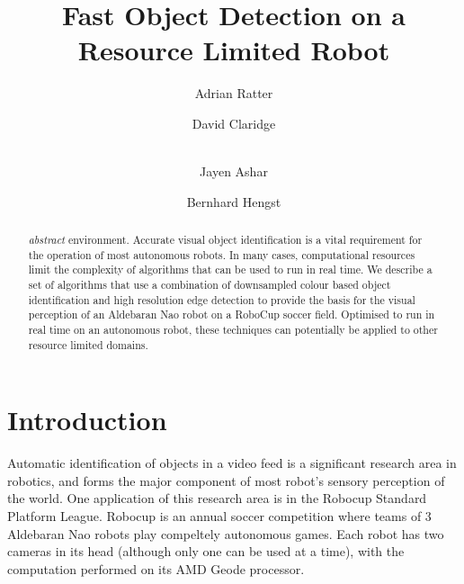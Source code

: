 \documentclass[runningheads,a4paper]{llncs}
\begin{document}
\mainmatter

\title{Fast Object Detection on a Resource Limited Robot}


\author{Adrian Ratter \and David Claridge\and \\
    Jayen  Ashar \and Bernhard Hengst}



%
%

\maketitle


\begin{abstract}
\emph{abstract} environment.
Accurate visual object identification is a vital requirement for the operation of most autonomous robots. In many cases, computational resources limit the complexity of algorithms that can be used to run in real time. We describe a set of algorithms that use a combination of downsampled colour based object identification and high resolution edge detection to provide the basis for the visual perception of an Aldebaran Nao robot on a RoboCup soccer field. Optimised to run in real time on an autonomous robot, these techniques can potentially be applied to other resource limited domains.
\end{abstract}

\section{Introduction}

Automatic identification of objects in a video feed is a significant research area in robotics, and forms the major component of most robot’s sensory perception of the world. One application of this research area is in the Robocup Standard Platform League. Robocup is an annual soccer competition where teams of 3 Aldebaran Nao robots play compeltely autonomous games. Each robot has two cameras in its head (although only one can be used at a time), with the computation performed on its AMD Geode processor.
\end{document}
